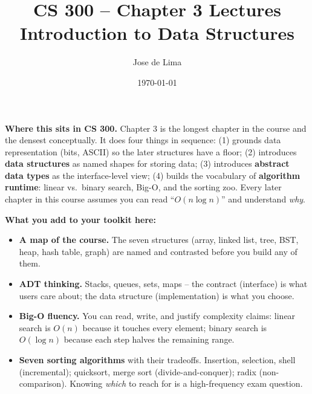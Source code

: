 \documentclass[11pt]{article}
\title{CS 300 -- Chapter 3 Lectures\\\large Introduction to Data Structures}
\author{Jose de Lima}
\date{\today}
\begin{document}
\maketitle

\begin{ideabox}
\textbf{Where this sits in CS 300.} Chapter 3 is the longest chapter in the
course and the densest conceptually. It does four things in sequence:
(1) grounds data representation (bits, ASCII) so the later structures
have a floor; (2) introduces \textbf{data structures} as named shapes for
storing data; (3) introduces \textbf{abstract data types} as the
interface-level view; (4) builds the vocabulary of \textbf{algorithm
runtime}: linear vs.\ binary search, Big-O, and the sorting zoo. Every
later chapter in this course assumes you can read ``$O(n \log n)$'' and
understand \emph{why}.

\textbf{What you add to your toolkit here:}
\begin{itemize}
    \item \textbf{A map of the course.} The seven structures (array,
          linked list, tree, BST, heap, hash table, graph) are named and
          contrasted before you build any of them.
    \item \textbf{ADT thinking.} Stacks, queues, sets, maps -- the
          contract (interface) is what users care about; the data
          structure (implementation) is what you choose.
    \item \textbf{Big-O fluency.} You can read, write, and justify
          complexity claims: linear search is $O(n)$ because it touches
          every element; binary search is $O(\log n)$ because each step
          halves the remaining range.
    \item \textbf{Seven sorting algorithms} with their tradeoffs.
          Insertion, selection, shell (incremental); quicksort, merge
          sort (divide-and-conquer); radix (non-comparison). Knowing
          \emph{which} to reach for is a high-frequency exam question.
\end{itemize}


\end{ideabox}
\end{document}
